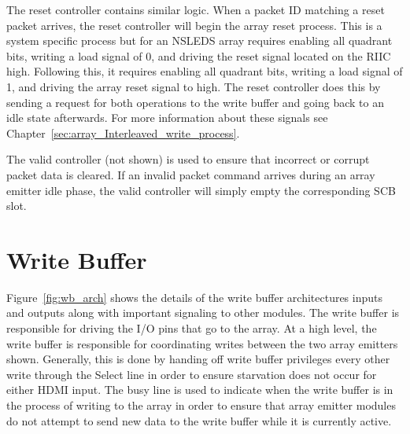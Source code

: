     The reset controller contains similar logic. When a packet ID matching a reset packet arrives, the reset controller will begin the array reset process. This is a system specific process but for an NSLEDS array requires enabling all quadrant bits, writing a load signal of 0, and driving the reset signal located on the RIIC high. Following this, it requires enabling all quadrant bits, writing a load signal of 1, and driving the array reset signal to high. The reset controller does this by sending a request for both operations to the write buffer and going back to an idle state afterwards. For more information about these signals see Chapter~\ref{sec:array_Interleaved_write_process}.

    The valid controller (not shown) is used to ensure that incorrect or corrupt packet data is cleared. If an invalid packet command arrives during an array emitter idle phase, the valid controller will simply empty the corresponding SCB slot.

\section{Write Buffer}

    Figure~\ref{fig:wb_arch} shows the details of the write buffer architectures inputs and outputs along with important signaling to other modules. The write buffer is responsible for driving the I/O pins that go to the array. At a high level, the write buffer is responsible for coordinating writes between the two array emitters shown. Generally, this is done by handing off write buffer privileges every other write through the Select line in order to ensure starvation does not occur for either HDMI input. The busy line is used to indicate when the write buffer is in the process of writing to the array in order to ensure that array emitter modules do not attempt to send new data to the write buffer while it is currently active.

